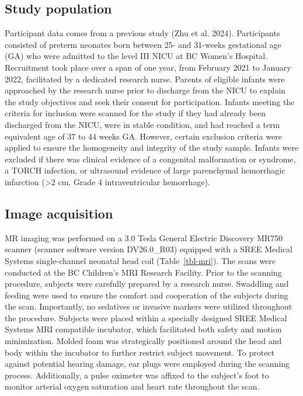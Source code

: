 \documentclass[
sn-nature
]{sn-jnl}
\begin{document}
\subsection{Study population}\label{study-population}

Participant data comes from a previous study (Zhu et al. 2024).
Participants consisted of preterm neonates born between 25- and 31-weeks
gestational age (GA) who were admitted to the level III NICU at BC
Women's Hospital. Recruitment took place over a span of one year, from
February 2021 to January 2022, facilitated by a dedicated research
nurse. Parents of eligible infants were approached by the research nurse
prior to discharge from the NICU to explain the study objectives and
seek their consent for participation. Infants meeting the criteria for
inclusion were scanned for the study if they had already been discharged
from the NICU, were in stable condition, and had reached a term
equivalent age of 37 to 44 weeks GA. However, certain exclusion criteria
were applied to ensure the homogeneity and integrity of the study
sample. Infants were excluded if there was clinical evidence of a
congenital malformation or syndrome, a TORCH infection, or ultrasound
evidence of large parenchymal hemorrhagic infarction (\textgreater2 cm,
Grade 4 intraventricular hemorrhage).

\subsection{Image acquisition}\label{image-acquisition}

MR imaging was performed on a 3.0 Tesla General Electric Discovery MR750
scanner (scanner software version DV26.0\_R03) equipped with a SREE
Medical Systems single-channel neonatal head coil (Table~\ref{tbl-mri}).
The scans were conducted at the BC Children's MRI Research Facility.
Prior to the scanning procedure, subjects were carefully prepared by a
research nurse. Swaddling and feeding were used to ensure the comfort
and cooperation of the subjects during the scan. Importantly, no
sedatives or invasive markers were utilized throughout the procedure.
Subjects were placed within a specially designed SREE Medical Systems
MRI compatible incubator, which facilitated both safety and motion
minimization. Molded foam was strategically positioned around the head
and body within the incubator to further restrict subject movement. To
protect against potential hearing damage, ear plugs were employed during
the scanning process. Additionally, a pulse oximeter was affixed to the
subject's foot to monitor arterial oxygen saturation and heart rate
throughout the scan.
\end{document}
